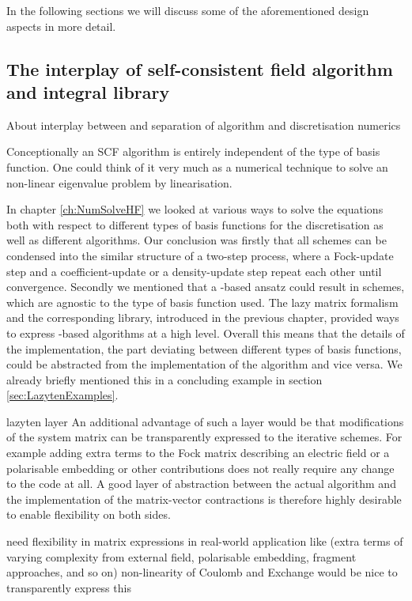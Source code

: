 In the following sections we will discuss some of the
aforementioned design aspects in more detail.

\subsection{The interplay of self-consistent field algorithm and integral library}
\label{sec:GscfGint}
About interplay between \gint and \gscf
separation of \SCF algorithm and discretisation numerics

Conceptionally an SCF algorithm is entirely independent of the type of basis function.
One could think of it very much as a numerical technique to solve
an non-linear eigenvalue problem by linearisation.

In chapter \vref{ch:NumSolveHF} we looked at various ways to solve the
\HF equations both with respect to different types of basis functions
for the discretisation as well as different \SCF algorithms.
Our conclusion was firstly that all \SCF schemes can be
condensed into the similar structure of a two-step process,
where a Fock-update step and a coefficient-update or a density-update step
repeat each other until convergence.
Secondly we mentioned that a \contraction-based ansatz could result in \SCF schemes,
which are agnostic to the type of basis function used.
The lazy matrix formalism and the corresponding \lazyten library,
introduced in the previous chapter,
provided ways to express \contraction-based algorithms at a high level.
Overall this means that the details of the \contraction implementation,
\ie the part deviating between different types of basis functions,
could be abstracted from the implementation of the \SCF algorithm
and vice versa.
We already briefly mentioned this in a concluding example
in section \vref{sec:LazytenExamples}.

lazyten layer
An additional advantage of such a layer would be that
modifications of the system matrix can be transparently expressed
to the iterative schemes.
For example adding extra terms to the Fock matrix
describing an electric field or a polarisable embedding
or other contributions does not really require
any change to the \SCF code at all.
A good layer of abstraction between the actual \SCF algorithm
and the implementation of the matrix-vector contractions
is therefore highly desirable to enable flexibility on both sides.

need flexibility in matrix expressions in real-world application
like \SCF (extra terms of varying complexity from external field,
polarisable embedding, fragment approaches, and so on)
non-linearity of Coulomb and Exchange
would be nice to transparently express this

